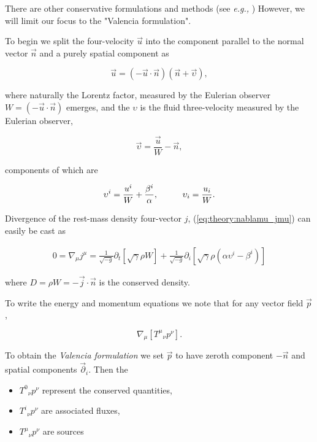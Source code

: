 There are other conservative formulations and methods (see \textit{e.g.,} \cite{Papadopoulos:1999kt})
However, we will limit our focus to the "Valencia formulation".

To begin we split the four-velocity $\vec{u}$ into the component parallel to the normal vector $\vec{n}$ and a purely spatial component as

\begin{equation}
\vec{u} = (-\vec{u} \cdot \vec{n})(\vec{n} + \vec{\upsilon}),
\end{equation}

where naturally the Lorentz factor, measured by the Eulerian observer 
$W = (-\vec{u}\cdot\vec{n})$ emerges, and the $\upsilon$ is the fluid three-velocity measured by the Eulerian observer, 

\begin{equation}
\vec{\upsilon} = \frac{\vec{u}}{W} -\vec{n},
\end{equation}

components of which are

\begin{equation}
\upsilon^i = \frac{u^i}{W}+ \frac{\beta^i}{\alpha}, \hspace{10mm} \upsilon_i= \frac{u_{i}}{W}.
\end{equation}

Divergence of the rest-mass density four-vector $j$, (\ref{eq:theory:nablamu_jmu}) can easily be cast as 

\begin{eqnarray}
0 = \nabla_{\mu}j^{\mu} = \frac{1}{\sqrt{-g}}\partial_{t}[\sqrt{\gamma}\rho W] + \frac{1}{\sqrt{-g}}\partial_{i}[\sqrt{\gamma}\rho(\alpha \upsilon^{i} - \beta^{i})]
\end{eqnarray}

where $D= \rho W = -\vec{j}\cdot \vec{n}$ is the conserved density.

To write the energy and momentum equations we note that for any vector field $\vec{p} $ \cite{Rezzolla:2013}, 

\begin{equation}
\nabla_{\mu}[{T^{\mu}}_{\nu}p^{\nu}].
\end{equation}

To obtain the \textit{Valencia formulation} we set $\vec{p}$ to have zeroth component $-\vec{n}$ and spatial components $\vec{\partial}_i$. 
Then the

\begin{itemize}
    \item ${T^0}_{\nu}p^{\nu}$ represent the conserved quantities,
    \item ${T^i}_{\nu}p^{\nu}$ are associated fluxes,
    \item ${T^{\mu}}_{\nu}p^{\nu}$ are sources
\end{itemize}

